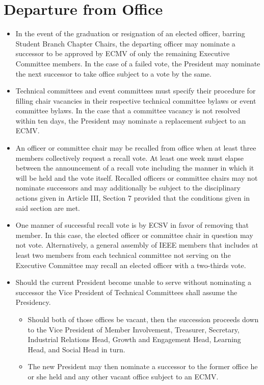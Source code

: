 \documentclass[12pt]{constitution}
\begin{document}
\section{Departure from Office}
\label{sec:exec_depart}
\begin{itemize}
    \item In the event of the graduation or resignation of an elected officer, barring Student Branch Chapter Chairs, the departing officer may nominate a successor to be approved by ECMV of only the remaining Executive Committee members. In the case of a failed vote, the President may nominate the next successor to take office subject to a vote by the same.
    \item Technical committees and event committees must specify their procedure for filling chair vacancies in their respective technical committee bylaws or event committee bylaws. In the case that a committee vacancy is not resolved within ten days, the President may nominate a replacement subject to an ECMV.
    \item An officer or committee chair may be recalled from office when at least three members collectively request a recall vote. At least one week must elapse between the announcement of a recall vote including the manner in which it will be held and the vote itself. Recalled officers or committee chairs may not nominate successors and may additionally be subject to the disciplinary actions given in Article III, Section 7 provided that the conditions given in said section are met.
    \item One manner of successful recall vote is by ECSV in favor of removing that member. In this case, the elected officer or committee chair in question may not vote. Alternatively, a general assembly of IEEE members that includes at least two members from each technical committee not serving on the Executive Committee may recall an elected officer with a two-thirds vote.
    \item Should the current President become unable to serve without nominating a successor the Vice President of Technical Committees shall assume the Presidency.
    \begin{itemize}
        \item Should both of those offices be vacant, then the succession proceeds down to the Vice President of Member Involvement, Treasurer, Secretary, Industrial Relations Head, Growth and Engagement Head, Learning Head, and Social Head in turn.
        \item The new President may then nominate a successor to the former office he or she held and any other vacant office subject to an ECMV.
    \end{itemize}
\end{itemize}
\end{document}
